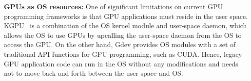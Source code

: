 \textbf{GPUs as OS resources:}
One of significant limitations on current GPU programming frameworks is
that GPU applications must reside in the user space.
KGPU~\cite{Sun_SECURITY11_Poster} is a combination of the OS kernel
module and user-space daemon, which allows the OS to use GPUs by
upcalling the user-space daemon from the OS to access the GPU.
On the other hand, Gdev provides OS modules with a set of traditional
API functions for GPU programming, such as CUDA.
Hence, legacy GPU application code can run in the OS without any
modifications and needs not to move back and forth between the user
space and OS.